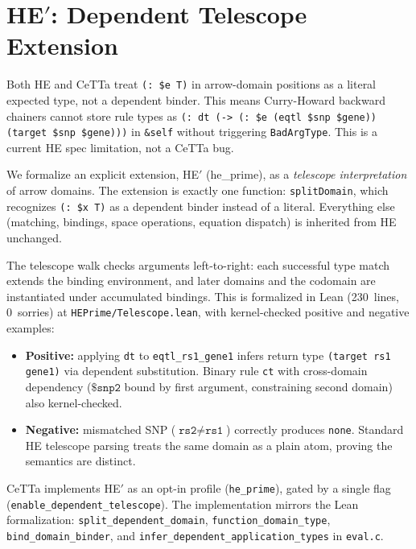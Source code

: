 \documentclass[11pt]{article}
\newcommand{\code}[1]{\texttt{#1}}
\newcommand{\CeTTa}{\textup{CeTTa}}
\begin{document}
\section{HE$'$: Dependent Telescope Extension}
\label{sec:heprime}

Both HE and \CeTTa{} treat \code{(: \$e T)} in arrow-domain positions as a
literal expected type, not a dependent binder.  This means Curry-Howard
backward chainers cannot store rule types as \code{(: dt (-> (: \$e
(eqtl \$snp \$gene)) (target \$snp \$gene)))} in \code{\&self} without
triggering \code{BadArgType}.  This is a current HE spec limitation, not
a \CeTTa{} bug.

We formalize an explicit extension, HE$'$ (he\_prime), as a
\emph{telescope interpretation} of arrow domains.  The extension is
exactly one function: \code{splitDomain}, which recognizes \code{(: \$x
T)} as a dependent binder instead of a literal.  Everything else
(matching, bindings, space operations, equation dispatch) is inherited
from HE unchanged.

The telescope walk checks arguments left-to-right: each successful
type match extends the binding environment, and later domains and the
codomain are instantiated under accumulated bindings.  This is
formalized in Lean (230~lines, 0~sorries) at
\code{HEPrime/Telescope.lean}, with kernel-checked positive and
negative examples:

\begin{itemize}
\item \textbf{Positive:} applying \code{dt} to \code{eqtl\_rs1\_gene1}
  infers return type \code{(target rs1 gene1)} via dependent
  substitution.  Binary rule \code{ct} with cross-domain dependency
  ($\code{\$snp2}$ bound by first argument, constraining second domain)
  also kernel-checked.
\item \textbf{Negative:} mismatched SNP ($\code{rs2} \neq \code{rs1}$)
  correctly produces \code{none}.  Standard HE telescope parsing treats
  the same domain as a plain atom, proving the semantics are distinct.
\end{itemize}

\CeTTa{} implements HE$'$ as an opt-in profile (\code{he\_prime}),
gated by a single flag (\code{enable\_dependent\_telescope}).  The
implementation mirrors the Lean formalization: \code{split\_dependent\_domain},
\code{function\_domain\_type}, \code{bind\_domain\_binder}, and
\code{infer\_dependent\_application\_types} in \code{eval.c}.
\end{document}
